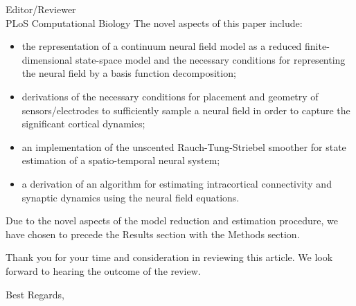 \documentclass[a4paper,10pt]{letter}
\begin{document}
\begin{letter}{Editor/Reviewer \\ PLoS Computational Biology}
The novel aspects of this paper include:
\begin{itemize}
	\item the representation of a continuum neural field model as a reduced finite-dimensional state-space model and the necessary conditions for representing the neural field by a basis function decomposition;
	\item derivations of the necessary conditions for placement and geometry of sensors/electrodes to sufficiently sample a neural field in order to capture the significant cortical dynamics;
	\item an implementation of the unscented Rauch-Tung-Striebel smoother for state estimation of a spatio-temporal neural system;
	\item a derivation of an algorithm for estimating intracortical connectivity and synaptic dynamics using the neural field equations.
\end{itemize}

Due to the novel aspects of the model reduction and estimation procedure, we have chosen to precede the Results section with the Methods section.

Thank you for your time and consideration in reviewing this article. We look forward to hearing the outcome of the review.

\closing{Best Regards,}

% 
\end{letter}
\end{document}
